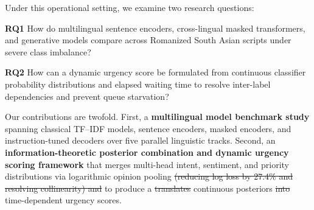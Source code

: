 Under this operational setting, we examine two research questions:

\textbf{RQ1} How do multilingual sentence encoders, cross-lingual masked transformers, and generative models compare across Romanized South Asian scripts under severe class imbalance? 

\textbf{RQ2} How can a dynamic urgency score be formulated from continuous classifier probability distributions and elapsed waiting time to resolve inter-label dependencies and prevent queue starvation?

Our contributions are twofold. First, a \textbf{multilingual model benchmark study} spanning classical TF--IDF models, sentence encoders, masked encoders, and instruction-tuned decoders over five parallel linguistic tracks. Second, an \textbf{information-theoretic posterior combination and dynamic urgency scoring framework} that merges multi-head intent, sentiment, and priority distributions via logarithmic opinion pooling \sout{(reducing log loss by 27.4\% and resolving collinearity) and} to produce a \sout{translates} continuous posteriors \sout{into} time-dependent urgency scores.
